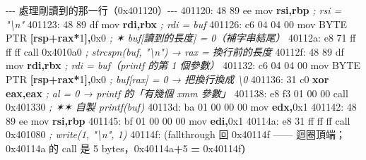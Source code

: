 \documentclass[10pt,a4paper]{article}
\newenvironment{Shaded}{\begin{snugshade}}{\end{snugshade}}
\newcommand{\BaseNTok}[1]{\textcolor[rgb]{0.00,0.00,0.81}{#1}}
\newcommand{\CommentTok}[1]{\textcolor[rgb]{0.56,0.35,0.01}{\textit{#1}}}
\newcommand{\DataTypeTok}[1]{\textcolor[rgb]{0.13,0.29,0.53}{#1}}
\newcommand{\DecValTok}[1]{\textcolor[rgb]{0.00,0.00,0.81}{#1}}
\newcommand{\KeywordTok}[1]{\textcolor[rgb]{0.13,0.29,0.53}{\textbf{#1}}}
\newcommand{\NormalTok}[1]{#1}
\newcommand{\OperatorTok}[1]{\textcolor[rgb]{0.81,0.36,0.00}{\textbf{#1}}}
\renewenvironment{Shaded}{%
  \def\FrameCommand{\fboxsep=3.2pt\colorbox{shadecolor}}%
  \MakeFramed{\advance\hsize-\width\FrameRestore\small}%
}{%
  \endMakeFramed
}
\begin{document}
\begin{Shaded}
\begin{Highlighting}[]
\NormalTok{{-}{-}{-} 處理剛讀到的那一行（0x401120）{-}{-}{-}}
\NormalTok{  401120: 48 89 ee           mov  }\KeywordTok{rsi}\OperatorTok{,}\KeywordTok{rbp}    \CommentTok{; rsi = "\textbackslash{}n"}
\NormalTok{  401123: 48 89 }\DataTypeTok{df}\NormalTok{           mov  }\KeywordTok{rdi}\OperatorTok{,}\KeywordTok{rbx}    \CommentTok{; rdi = buf}
\NormalTok{  401126: c6 }\DecValTok{04} \DecValTok{04} \DecValTok{00}\NormalTok{        mov  }\DataTypeTok{BYTE} \DataTypeTok{PTR} \OperatorTok{[}\KeywordTok{rsp}\OperatorTok{+}\KeywordTok{rax}\OperatorTok{*}\DecValTok{1}\OperatorTok{],}\BaseNTok{0x0}   \CommentTok{; ✶ buf[讀到的長度] = 0（補字串結尾）}
\NormalTok{  40112a: e8 }\DecValTok{71}\NormalTok{ ff ff ff     call }\BaseNTok{0x4010a0}   \CommentTok{; strcspn(buf, "\textbackslash{}n") → rax = 換行前的長度}
\NormalTok{  40112f: 48 89 }\DataTypeTok{df}\NormalTok{           mov  }\KeywordTok{rdi}\OperatorTok{,}\KeywordTok{rbx}    \CommentTok{; rdi = buf（printf 的第 1 個參數）}
\NormalTok{  401132: c6 }\DecValTok{04} \DecValTok{04} \DecValTok{00}\NormalTok{        mov  }\DataTypeTok{BYTE} \DataTypeTok{PTR} \OperatorTok{[}\KeywordTok{rsp}\OperatorTok{+}\KeywordTok{rax}\OperatorTok{*}\DecValTok{1}\OperatorTok{],}\BaseNTok{0x0}   \CommentTok{; buf[rax] = 0 → 把換行換成 \textquotesingle{}\textbackslash{}0\textquotesingle{}}
\NormalTok{  401136: 31 c0              }\OperatorTok{xor}  \KeywordTok{eax}\OperatorTok{,}\KeywordTok{eax}    \CommentTok{; al = 0 → printf 的「有幾個 xmm 參數」}
\NormalTok{  401138: e8 f3 }\DecValTok{01} \DecValTok{00} \DecValTok{00}\NormalTok{     call }\BaseNTok{0x401330}   \CommentTok{; ✶✶ 自製 printf(buf)}
\NormalTok{  40113d: ba }\DecValTok{01} \DecValTok{00} \DecValTok{00} \DecValTok{00}\NormalTok{     mov  }\KeywordTok{edx}\OperatorTok{,}\BaseNTok{0x1}
\NormalTok{  401142: 48 89 ee           mov  }\KeywordTok{rsi}\OperatorTok{,}\KeywordTok{rbp}
\NormalTok{  401145: bf }\DecValTok{01} \DecValTok{00} \DecValTok{00} \DecValTok{00}\NormalTok{     mov  }\KeywordTok{edi}\OperatorTok{,}\BaseNTok{0x1}
\NormalTok{  40114a: e8 }\DecValTok{31}\NormalTok{ ff ff ff     call }\BaseNTok{0x401080}   \CommentTok{; write(1, "\textbackslash{}n", 1)}
\NormalTok{  40114f: (fallthrough 回 }\BaseNTok{0x40114f}\NormalTok{ —— 迴圈頂端；}\BaseNTok{0x40114a}\NormalTok{ 的 call 是 }\DecValTok{5}\NormalTok{ bytes，}\BaseNTok{0x40114a}\OperatorTok{+}\DecValTok{5} \OperatorTok{=} \BaseNTok{0x40114f}\OperatorTok{)}
\end{Highlighting}
\end{Shaded}
\end{document}

